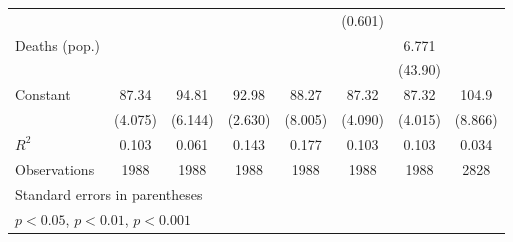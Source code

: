 \documentclass{article}
\begin{document}
{\begin{longtable}{l*{7}{c}}
                &                  &                  &                  &                  &  (0.601)         &                  &                  \\
Deaths (pop.)   &                  &                  &                  &                  &                  &    6.771         &                  \\
                &                  &                  &                  &                  &                  &  (43.90)         &                  \\
Constant        &    87.34\sym{***}&    94.81\sym{***}&    92.98\sym{***}&    88.27\sym{***}&    87.32\sym{***}&    87.32\sym{***}&    104.9\sym{***}\\
                &  (4.075)         &  (6.144)         &  (2.630)         &  (8.005)         &  (4.090)         &  (4.015)         &  (8.866)         \\
\hline
\(R^{2}\)       &    0.103         &    0.061         &    0.143         &    0.177         &    0.103         &    0.103         &    0.034         \\
Observations    &     1988         &     1988         &     1988         &     1988         &     1988         &     1988         &     2828         \\
\hline\hline
\multicolumn{8}{l}{\footnotesize Standard errors in parentheses}\\
\multicolumn{8}{l}{\footnotesize \sym{*} \(p<0.05\), \sym{**} \(p<0.01\), \sym{***} \(p<0.001\)}\\
\end{longtable}
}
\end{document}
